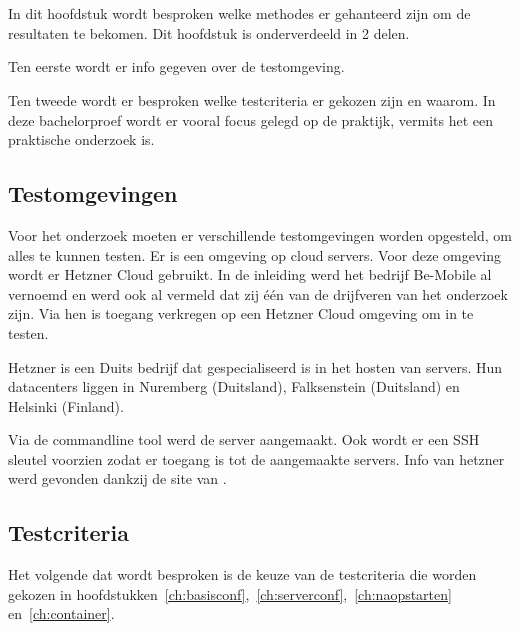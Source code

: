 
\chapter{}
\label{ch:methodologie}

In dit hoofdstuk wordt besproken welke methodes er gehanteerd zijn om de resultaten te bekomen. Dit hoofdstuk is onderverdeeld in 2 delen. 

Ten eerste wordt er info gegeven over de  testomgeving. 

Ten tweede wordt er besproken welke testcriteria er gekozen zijn en waarom. In deze bachelorproef wordt er vooral focus gelegd op de praktijk, vermits het een praktische onderzoek is.

\section{Testomgevingen}
Voor het onderzoek moeten er verschillende testomgevingen worden opgesteld, om alles te kunnen testen. Er is een omgeving op cloud servers. Voor deze omgeving wordt er Hetzner Cloud gebruikt. In de inleiding werd het bedrijf Be-Mobile al vernoemd en werd ook al vermeld dat zij één van de drijfveren van het onderzoek zijn. Via hen is toegang verkregen op een Hetzner Cloud omgeving om in te testen. 

Hetzner is een Duits bedrijf dat gespecialiseerd is in het hosten van servers. Hun datacenters liggen in Nuremberg (Duitsland), Falksenstein (Duitsland) en Helsinki (Finland). 

Via de commandline tool werd de server aangemaakt. Ook wordt er een SSH sleutel voorzien zodat er toegang is tot de aangemaakte servers. Info van hetzner werd gevonden dankzij de site van \autocite{hetzner}.

\section{Testcriteria}
Het volgende dat wordt besproken is de keuze van de testcriteria die worden gekozen in hoofdstukken~\ref{ch:basisconf},~\ref{ch:serverconf},~\ref{ch:naopstarten} en~\ref{ch:container}. 

